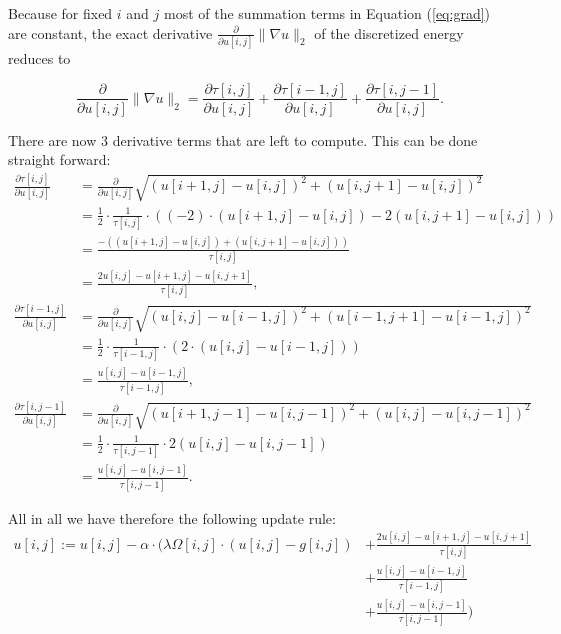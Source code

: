 \documentclass{paper}
\begin{document}
Because for fixed $i$ and $j$ most of the summation terms in Equation (\ref{eq:grad}) are constant, the exact derivative $\frac{\partial}{\partial u[i,j]} \|\nabla u \|_2$ of the discretized energy reduces to

$$\frac{\partial}{\partial u[i,j]} \|\nabla u \|_2 = \frac{\partial \tau[i,j]}{\partial u[i,j]} + \frac{\partial \tau[i-1,j]}{\partial u[i,j]} + \frac{\partial \tau[i,j-1]}{\partial u[i,j]}.$$

There are now 3 derivative terms that are left to compute. This can be done straight forward:
\begin{align*}
\frac{\partial \tau[i,j]}{\partial u[i,j]} &= \frac{\partial}{\partial u[i,j]} \sqrt{(u[i+1,j] - u[i,j])^2 + (u[i,j+1] - u[i,j])^2} \\
&= \frac{1}{2} \cdot \frac{1}{\tau[i,j]} \cdot \left((-2) \cdot (u[i+1,j] - u[i,j]) -2 (u[i,j+1] - u[i,j])\right) \\
&= \frac{- ((u[i+1,j] - u[i,j]) + (u[i,j+1] - u[i,j]))}{\tau[i,j]} \\
&= \frac{2 u[i,j] - u[i+1,j] - u[i,j+1]}{\tau[i,j]}, \\
\frac{\partial \tau[i-1,j]}{\partial u[i,j]} &= \frac{\partial}{\partial u[i,j]} \sqrt{(u[i,j] - u[i-1,j])^2 + (u[i-1,j+1] - u[i-1,j])^2} \\
&= \frac{1}{2} \cdot \frac{1}{\tau[i-1,j]} \cdot \left( 2 \cdot (u[i,j] - u[i-1,j]) \right) \\
&= \frac{u[i,j]-u[i-1,j]}{\tau[i-1,j]}, \\
\frac{\partial \tau[i,j-1]}{\partial u[i,j]} &= \frac{\partial}{\partial u[i,j]} \sqrt{(u[i+1,j-1] - u[i,j-1])^2 + (u[i,j] - u[i,j-1])^2} \\
&= \frac{1}{2} \cdot \frac{1}{\tau[i,j-1]} \cdot 2 (u[i,j] - u[i,j-1]) \\
&= \frac{u[i,j] - u[i,j-1]}{\tau[i,j-1]}.
\end{align*}

All in all we have therefore the following update rule:
\begin{equation*}
\begin{aligned}
  u[i,j] := u[i,j] - \alpha \cdot \Bigg( \lambda \Omega[i,j] \cdot (u[i,j]-g[i,j]) &+ \frac{2 u[i,j] - u[i+1,j] - u[i,j+1]}{\tau[i,j]} \\ 
  &+ \frac{u[i,j]-u[i-1,j]}{\tau[i-1,j]} \\ 
  &+ \frac{u[i,j] - u[i,j-1]}{\tau[i,j-1]}\Bigg)
\end{aligned}
\label{eq:update-final}
\end{equation*}
\end{document}
